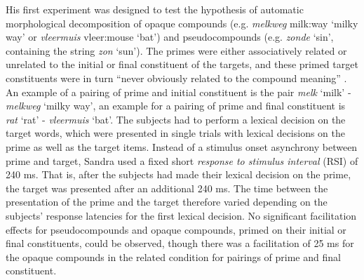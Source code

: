 
His first experiment was designed to test the hypothesis of automatic
morphological decomposition of opaque compounds (e.g. \emph{melkweg}
milk:way `milky way' or \emph{vleermuis} %
vleer:mouse `bat') and pseudocompounds (e.g. \emph{zonde} `sin',
containing the string \emph{zon} `sun'). 
The primes were either
associatively related or unrelated to the initial or final constituent
of the targets, and these primed target constituents were in turn
``never obviously related to the compound meaning''
\citep[536--537]{Sandra:1990}. An example of a pairing of prime and
initial constituent is the pair \emph{melk} `milk' -
\emph{melkweg} `milky way', an example for a pairing of prime and
final constituent is \emph{rat} `rat' - \emph{vleermuis}
`bat'. The subjects had to perform a lexical decision on the target
words, which were presented in single trials with lexical decisions on
the prime as well as the target items. Instead of a stimulus onset asynchrony
between prime and target, Sandra used a fixed short \emph{response to stimulus
interval} (RSI) of 240 ms. That is, after the subjects had made their
lexical decision on the prime, the target was presented after an
additional 240 ms. The time between the presentation of the prime and
the target therefore varied depending on the subjects' response
latencies for the first lexical decision. No significant facilitation effects for
pseudocompounds and opaque compounds, primed on their initial or
final constituents, could be observed, though there was a
facilitation
of 25 ms for the opaque compounds in the related condition for pairings of prime and final
constituent. 

